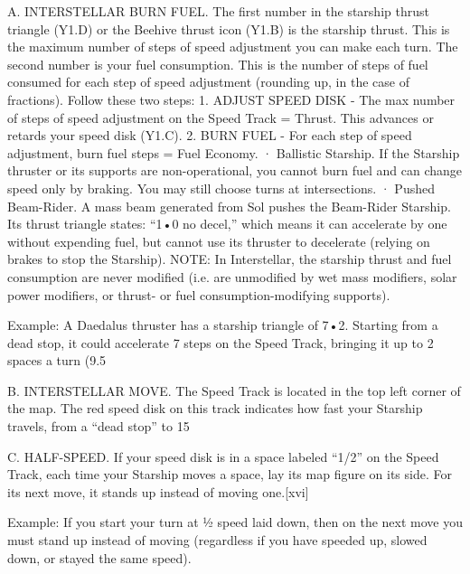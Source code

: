 \documentclass[a4paper]{book}
\begin{document}
A. INTERSTELLAR BURN FUEL. The first number in the starship thrust triangle (Y1.D) or the Beehive thrust icon (Y1.B) is the starship thrust. This is the maximum number of steps of speed adjustment you can make each turn. The second number is your fuel consumption. This is the number of steps of fuel consumed for each step of speed adjustment (rounding up, in the case of fractions). Follow these two steps:
1. ADJUST SPEED DISK - The max number of steps of speed adjustment on the Speed Track = Thrust. This advances or retards your speed disk (Y1.C).
2. BURN FUEL - For each step of speed adjustment, burn fuel steps = Fuel Economy.
·       Ballistic Starship. If the Starship thruster or its supports are non-operational, you cannot burn fuel and can change speed only by braking. You may still choose turns at intersections.
·       Pushed Beam-Rider. A mass beam generated from Sol pushes the Beam-Rider Starship. Its thrust triangle states: “1•0 no decel,” which means it can accelerate by one without expending fuel, but cannot use its thruster to decelerate (relying on brakes to stop the Starship).
NOTE: In Interstellar, the starship thrust and fuel consumption are never modified (i.e. are unmodified by wet mass modifiers, solar power modifiers, or thrust- or fuel consumption-modifying supports).
 
Example: A Daedalus thruster has a starship triangle of 7•2. Starting from a dead stop, it could accelerate 7 steps on the Speed Track, bringing it up to 2 spaces a turn (9.5%
 
B. INTERSTELLAR MOVE. The Speed Track is located in the top left corner of the map. The red speed disk on this track indicates how fast your Starship travels, from a “dead stop” to 15%
 
C. HALF-SPEED. If your speed disk is in a space labeled “1/2” on the Speed Track, each time your Starship moves a space, lay its map figure on its side. For its next move, it stands up instead of moving one.[xvi]
 
Example: If you start your turn at ½ speed laid down, then on the next move you must stand up instead of moving (regardless if you have speeded up, slowed down, or stayed the same speed).
 
\end{document}
